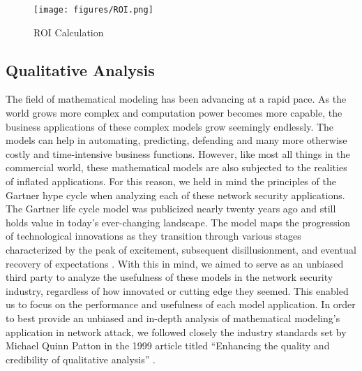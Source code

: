 \documentclass{article}
\begin{document}
\begin{figure}
    \centering
    \texttt{[image: figures/ROI.png]}
    \caption{ROI Calculation}
\end{figure}

\subsection{Qualitative Analysis}
The field of mathematical modeling has been advancing at a rapid pace. As the world grows more complex and computation power becomes more capable, the business applications of these complex models grow seemingly endlessly. The models can help in automating, predicting, defending and many more otherwise costly and time-intensive business functions. However, like most all things in the commercial world, these mathematical models are also subjected to the realities of inflated applications. For this reason, we held in mind the principles of the Gartner hype cycle when analyzing each of these network security applications. The Gartner life cycle model was publicized nearly twenty years ago and still holds value in today’s ever-changing landscape. The model maps the progression of technological innovations as they transition through various stages characterized by the peak of excitement, subsequent disillusionment, and eventual recovery of expectations \cite{dedehayir2016hype}. With this in mind, we aimed to serve as an unbiased third party to analyze the usefulness of these models in the network security industry, regardless of how innovated or cutting edge they seemed. This enabled us to focus on the performance and usefulness of each model application. In order to best provide an unbiased and in-depth analysis of mathematical modeling’s application in network attack, we followed closely the industry standards set by Michael Quinn Patton in the 1999 article titled “Enhancing the quality and credibility of qualitative analysis” \cite{patton1999enhancing}. 
\end{document}
